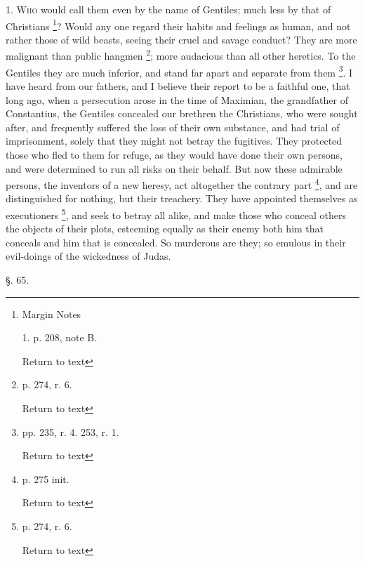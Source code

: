 1. W\textsc{ho} would call them even
by the name of Gentiles; much less by that of Christians \footnote{Margin Notes

1. p. 208, note B.

Return to text}?
Would any one regard their habits and feelings as human, and not
rather those of wild beasts, seeing their cruel and savage conduct?
They are more malignant than public hangmen \footnote{p. 274, r. 6.

Return to text}; more audacious
than all other heretics. To the Gentiles they are much inferior, and
stand far apart and separate from them \footnote{pp. 235, r. 4. 253, r. 1.

Return to text}. I have heard from our
fathers, and I believe their report to be a faithful one, that long
ago, when a persecution arose in the time of Maximian, the grandfather
of Constantius, the Gentiles concealed our brethren the Christians,
who were sought after, and frequently suffered the loss of their own
substance, and had trial of imprisonment, solely that they might not
betray the fugitives. They protected those who fled to them for
refuge, as they would have done their own persons, and were determined
to run all risks on their behalf. But now these admirable persons, the
inventors of a new heresy, act altogether the contrary part \footnote{p. 275 init.

Return to text},
and are distinguished for nothing, but their treachery. They have
appointed themselves as executioners \footnote{p. 274, r. 6.

Return to text}, and seek to betray all
alike, and make those who conceal others the objects of their plots,
esteeming equally as their enemy both him that conceals and him that
is concealed. So murderous are they; so emulous in their
evil-doings of the wickedness of Judas.

§. 65.

